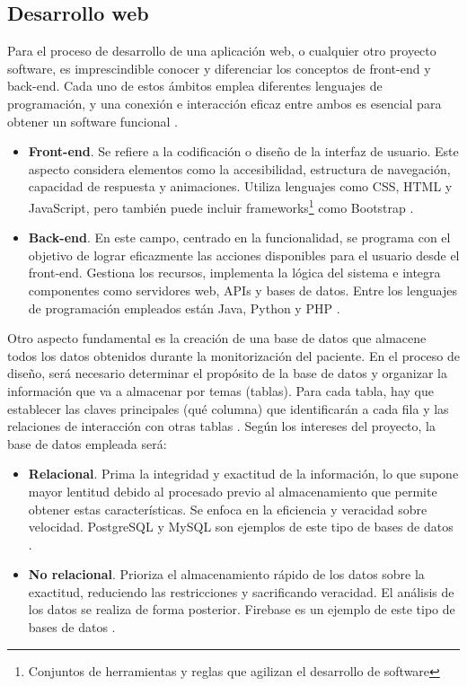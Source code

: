 \subsection{Desarrollo web}

Para el proceso de desarrollo de una aplicación web, o cualquier otro proyecto software, es imprescindible conocer y diferenciar los conceptos de front-end y back-end. Cada uno de estos ámbitos emplea diferentes lenguajes de programación, y una conexión e interacción eficaz entre ambos es esencial para obtener un software funcional \cite{FrontBack76:online}.
\begin{itemize}
    \item \textbf{Front-end}. Se refiere a la codificación o diseño de la interfaz de usuario. Este aspecto considera elementos como la accesibilidad, estructura de navegación, capacidad de respuesta y animaciones. Utiliza lenguajes como CSS, HTML y JavaScript, pero también puede incluir frameworks\footnote{Conjuntos de herramientas y reglas que agilizan el desarrollo de software} como Bootstrap \cite{Frontend43:online} \cite{FrontBack76:online}.
    \item \textbf{Back-end}. En este campo, centrado en la funcionalidad, se programa con el objetivo de lograr eficazmente las acciones disponibles para el usuario desde el front-end. Gestiona los recursos, implementa la lógica del sistema e integra componentes como servidores web, APIs y bases de datos. Entre los lenguajes de programación empleados están Java, Python y PHP \cite{Frontend43:online} \cite{FrontBack76:online}.
\end{itemize}

Otro aspecto fundamental es la creación de una base de datos que almacene todos los datos obtenidos durante la monitorización del paciente. En el proceso de diseño, será necesario determinar el propósito de la base de datos y organizar la información que va a almacenar por temas (tablas). Para cada tabla, hay que establecer las claves principales (qué columna) que identificarán a cada fila y las relaciones de interacción con otras tablas \cite{DBMicrosoft:online}. Según los intereses del proyecto, la base de datos empleada será:
\begin{itemize}
    \item \textbf{Relacional}. Prima la integridad y exactitud de la información, lo que supone mayor lentitud debido al procesado previo al almacenamiento que permite obtener estas características. Se enfoca en la eficiencia y veracidad sobre velocidad. PostgreSQL y MySQL son ejemplos de este tipo de bases de datos \cite{DB:online}.
    \item \textbf{No relacional}. Prioriza el almacenamiento rápido de los datos sobre la exactitud, reduciendo las restricciones y sacrificando veracidad. El análisis de los datos se realiza de forma posterior. Firebase es un ejemplo de este tipo de bases de datos \cite{DB:online}.
\end{itemize}

